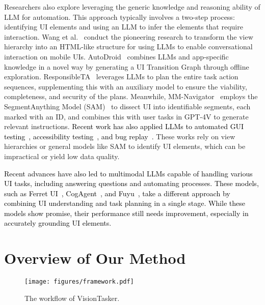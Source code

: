 Researchers also explore leveraging the generic knowledge and reasoning ability of LLM for automation. This approach typically involves a two-step process: identifying UI elements and using an LLM to infer the elements that require interaction. 
Wang et al.~\cite{wang2023enabling} conduct the pioneering research to transform the view hierarchy into an HTML-like structure for using LLMs to enable conversational interaction on mobile UIs. AutoDroid~\cite{wen2023empowering} combines LLMs and app-specific knowledge in a novel way by generating a UI Transition Graph through offline exploration. 
ResponsibleTA~\cite{zhang2023responsible} leverages LLMs to plan the entire task action sequences, supplementing this with an auxiliary model to ensure the viability, completeness, and security of the plans. Meanwhile, MM-Navigator~\cite{yan2023gpt} employs the SegmentAnything Model (SAM)~\cite{kirillov2023segment} to dissect UI into identifiable segments, each marked with an ID, and combines this with user tasks in GPT-4V to generate relevant instructions. 
\textcolor{black}{Recent work has also applied LLMs to automated GUI testing~\cite{liu2023chatting}, accessibility testing~\cite{taeb2024axnav}, and bug replay~\cite{feng2024prompting}.} These works rely on view hierarchies or general models like SAM to identify UI elements, which can be impractical or yield low data quality. 

\textcolor{black}{Recent advances have also led to multimodal LLMs capable of handling various UI tasks, including answering questions and automating processes. These models, such as Ferret UI~\cite{you2024ferret}, CogAgent~\cite{hong2024cogagent}, and Fuyu~\cite{ADEPT}, take a different approach by combining UI understanding and task planning in a single stage. While these models show promise, their performance still needs improvement, especially in accurately grounding UI elements.}

\section{Overview of Our Method}

\begin{figure}
    \centering
    \texttt{[image: figures/framework.pdf]}
    \caption{The workflow of VisionTasker.}
    \label{fig:framework}
    \vspace{-6mm}
\end{figure}

